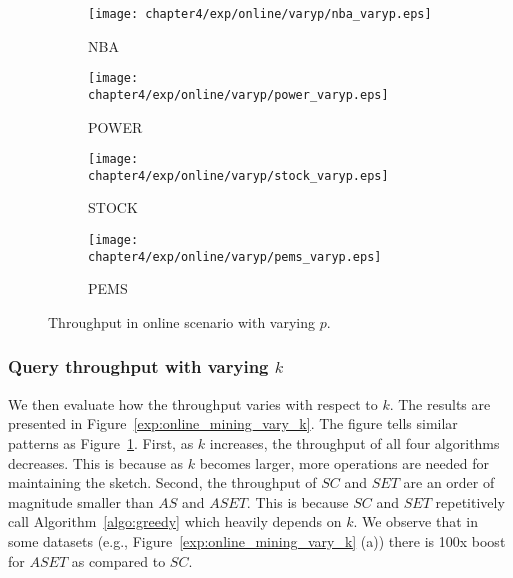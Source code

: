 \begin{figure}[t]
\centering
    \begin{subfigure}[b]{0.45\textwidth}
        \texttt{[image: chapter4/exp/online/varyp/nba\_varyp.eps]}
        \caption{NBA}
    \end{subfigure}
    \begin{subfigure}[b]{0.45\textwidth}
        \texttt{[image: chapter4/exp/online/varyp/power\_varyp.eps]}
        \caption{POWER}
    \end{subfigure}
    \begin{subfigure}[b]{0.45\textwidth}
        \texttt{[image: chapter4/exp/online/varyp/stock\_varyp.eps]}
        \caption{STOCK}
    \end{subfigure}
    \begin{subfigure}[b]{0.45\textwidth}
        \texttt{[image: chapter4/exp/online/varyp/pems\_varyp.eps]}
        \caption{PEMS}
    \end{subfigure}
\caption{Throughput in online scenario with varying $p$.}
\label{exp:online_mining_vary_P}
\end{figure}

\subsubsection{Query throughput with varying $k$} 
We then evaluate how the throughput varies with respect to $k$. 
The results are presented in Figure~\ref{exp:online_mining_vary_k}.
The figure tells similar patterns as
Figure~\ref{exp:online_mining_vary_P}.
First, as $k$ increases, the throughput of all four algorithms decreases.
This is because as $k$ becomes larger, more operations are needed for maintaining the sketch.
Second, the throughput of $SC$ and $SET$ are an order of magnitude smaller than $AS$ and $ASET$.
This is because $SC$ and $SET$ repetitively call Algorithm~\ref{algo:greedy} which heavily depends 
on $k$.
We observe that in some datasets (e.g., Figure~\ref{exp:online_mining_vary_k} (a)) there is 100x boost for $ASET$ as compared to $SC$.

